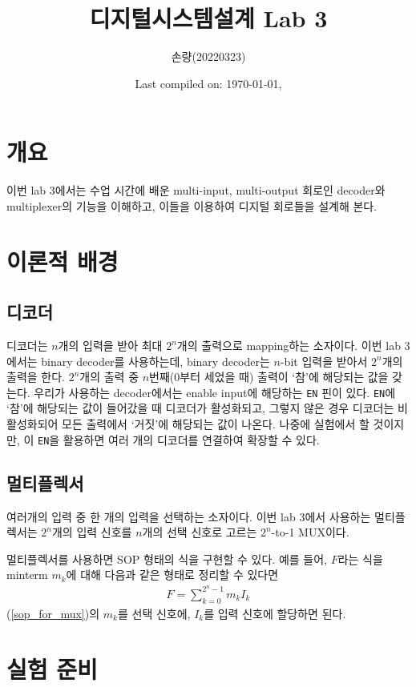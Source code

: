 \documentclass{scrartcl}
\title{디지털시스템설계 Lab 3}
\author{손량(20220323)}
\date{Last compiled on: \today, \currenttime}
\begin{document}
\maketitle

\section{개요}
이번 lab 3에서는 수업 시간에 배운 multi-input, multi-output 회로인 decoder와 multiplexer의 기능을 이해하고, 이들을 이용하여 디지털 회로들을 설계해 본다.

\section{이론적 배경}
\subsection{디코더}
디코더는 \(n\)개의 입력을 받아 최대 \(2^n\)개의 출력으로 mapping하는 소자이다.
이번 lab 3에서는 binary decoder를 사용하는데, binary decoder는 \(n\)-bit 입력을 받아서 \(2^n\)개의 출력을 한다.
\(2^n\)개의 출력 중 \(n\)번째(0부터 세었을 때) 출력이 `참'에 해당되는 값을 갖는다.
우리가 사용하는 decoder에서는 enable input에 해당하는 \texttt{EN} 핀이 있다.
\texttt{EN}에 `참'에 해당되는 값이 들어갔을 때 디코더가 활성화되고, 그렇지 않은 경우 디코더는 비활성화되어 모든 출력에서 `거짓'에 해당되는 값이 나온다.
나중에 실험에서 할 것이지만, 이 \texttt{EN}을 활용하면 여러 개의 디코더를 연결하여 확장할 수 있다.

\subsection{멀티플렉서}
여러개의 입력 중 한 개의 입력을 선택하는 소자이다.
이번 lab 3에서 사용하는 멀티플렉서는 \(2^n\)개의 입력 신호를 \(n\)개의 선택 신호로 고르는 \(2^n\)-to-1 MUX이다.

멀티플렉서를 사용하면 SOP 형태의 식을 구현할 수 있다.
예를 들어, \(F\)라는 식을 minterm \(m_k\)에 대해 다음과 같은 형태로 정리할 수 있다면
\begin{align}\label{sop_for_mux}
  F = \sum^{2^n - 1}_{k = 0} m_k I_k
\end{align}
(\ref{sop_for_mux})의 \(m_k\)를 선택 신호에, \(I_k\)를 입력 신호에 할당하면 된다.

\section{실험 준비}
\end{document}
